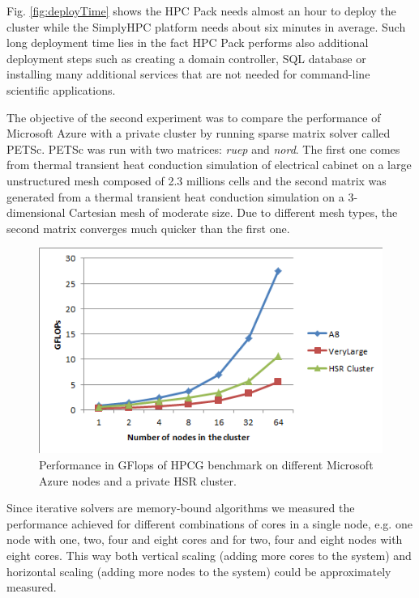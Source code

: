 \documentclass[3p,times]{elsarticle}
\begin{document}
Fig. \ref{fig:deployTime} shows the HPC Pack needs almost an hour to deploy the cluster while the SimplyHPC platform needs about six minutes in average. Such long deployment time lies in the fact HPC Pack performs also additional deployment steps such as creating a domain controller, SQL database or installing many additional services that are not needed for command-line scientific applications.

The objective of the second experiment was to compare the performance of Microsoft Azure with a private cluster by running sparse matrix solver called PETSc. PETSc was run with two matrices: \textit{ruep} and \textit{nord}. The first one comes from thermal transient heat conduction simulation of electrical cabinet on a large unstructured mesh composed of 2.3 millions cells and the second matrix was generated from a thermal transient heat conduction simulation on a 3-dimensional Cartesian mesh of moderate size. Due to different mesh types, the second matrix converges much quicker than the first one. 

\begin{figure}
\centering
	\includegraphics[width=.6\linewidth]{hpcg}
	
	\caption{Performance in GFlops of HPCG benchmark on different Microsoft Azure nodes and a private HSR cluster. }
	\label{fig:hpcg}
\end{figure}

Since iterative solvers are memory-bound algorithms we measured the performance achieved for different combinations of cores in a single node, e.g. one node with one, two, four and eight cores and for two, four and eight nodes with eight cores. This way both vertical scaling (adding more cores to the system) and horizontal scaling (adding more nodes to the system) could be approximately measured. %
\end{document}
